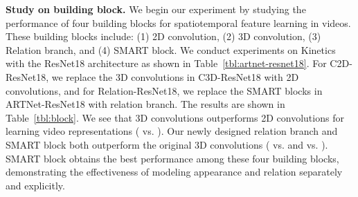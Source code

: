 \documentclass[10pt,twocolumn,letterpaper]{article}
\begin{document}
\begin{table}
\centering
{}
\vspace{1mm}
\caption{Comparison of ARTNet and C3D on the validation set of Kinetics dataset. We investigate the performance of basic blocks, including: 2D convolution, 3D convolution, relation branch, and SMART. We also study the effect of the stacking depth of the ARTNet. The performance is measured by {\bf Top-1 and Top-5 accuracy}.}
\label{tbl:block}
\vspace{-3mm}
\end{table}

{\bf Study on building block.} We begin our experiment by studying the performance of four building blocks for spatiotemporal feature learning in videos. These building blocks include: (1) 2D convolution, (2) 3D convolution, (3) Relation branch, and (4) SMART block. We conduct experiments on Kinetics with the ResNet18 architecture as shown in Table~\ref{tbl:artnet-resnet18}. For C2D-ResNet18, we replace the 3D convolutions in C3D-ResNet18 with 2D convolutions, and for Relation-ResNet18, we replace the SMART blocks in ARTNet-ResNet18 with relation branch. The results are shown in Table~\ref{tbl:block}. We see that 3D convolutions outperforms 2D convolutions for learning video representations ( vs. ). Our newly designed relation branch and SMART block both outperform the original 3D convolutions ( vs.  and  vs. ). SMART block obtains the best performance among these four building blocks, demonstrating the effectiveness of modeling appearance and relation separately and explicitly.
\end{document}
